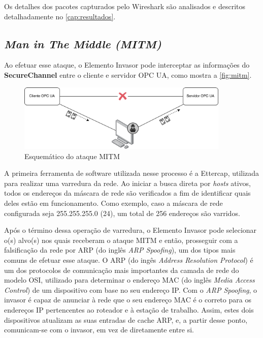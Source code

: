     Os detalhes dos pacotes capturados pelo Wireshark são analisados e descritos detalhadamente no \autoref{cap:resultados}.
    
    \subsection{\textit{Man in The Middle (MITM)}}

    Ao efetuar esse ataque, o Elemento Invasor pode interceptar as informações do \textbf{SecureChannel} entre o cliente e servidor OPC UA, como mostra a \autoref{fig:mitm}.

    \begin{figure}[htbp]
        \caption{\label{fig:mitm}Esquemático do ataque MITM}
        \begin{center}
            \includegraphics[width=0.9\textwidth]{USPSC-img/mitm.png}
        \end{center}
    \end{figure}
    
    A primeira ferramenta de software utilizada nesse processo é a Ettercap, utilizada para realizar uma varredura da rede. Ao iniciar a busca direta por \textit{hosts} ativos, todos os endereços da máscara de rede são verificados a fim de identificar quais deles estão em funcionamento. Como exemplo, caso a máscara de rede configurada seja 255.255.255.0 (24), um total de 256 endereços são varridos.
    
    Após o término dessa operação de varredura, o Elemento Invasor pode selecionar o(s) alvo(s) nos quais receberam o ataque MITM e então, prosseguir com a falsificação da rede por ARP (do inglês \textit{ARP Spoofing}), um dos tipos mais comuns de efetuar esse ataque. O ARP (do ingês \textit{Address Resolution Protocol}) é um dos protocolos de comunicação mais importantes da camada de rede do modelo OSI, utilizado para determinar o endereço MAC (do inglês \textit{Media Access Control}) de um dispositivo com base no seu endereço IP. Com o \textit{ARP Spoofing}, o invasor é capaz de anunciar à rede que o seu endereço MAC é o correto para os endereços IP pertencentes ao roteador e à estação de trabalho. Assim, estes dois dispositivos atualizam as suas entradas de cache ARP, e, a partir desse ponto, comunicam-se com o invasor, em vez de diretamente entre si.

